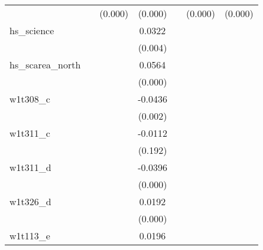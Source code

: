 {\begin{tabular}{l*{6}{c}}
            &                     &     (0.000)         &     (0.000)         &                     &     (0.000)         &     (0.000)         \\
[1em]
hs\_science  &                     &                     &      0.0322\sym{***}&                     &                     &                     \\
            &                     &                     &     (0.004)         &                     &                     &                     \\
[1em]
hs\_scarea\_north&                     &                     &      0.0564\sym{***}&                     &                     &                     \\
            &                     &                     &     (0.000)         &                     &                     &                     \\
[1em]
w1t308\_c    &                     &                     &     -0.0436\sym{***}&                     &                     &                     \\
            &                     &                     &     (0.002)         &                     &                     &                     \\
[1em]
w1t311\_c    &                     &                     &     -0.0112         &                     &                     &                     \\
            &                     &                     &     (0.192)         &                     &                     &                     \\
[1em]
w1t311\_d    &                     &                     &     -0.0396\sym{***}&                     &                     &                     \\
            &                     &                     &     (0.000)         &                     &                     &                     \\
[1em]
w1t326\_d    &                     &                     &      0.0192\sym{***}&                     &                     &                     \\
            &                     &                     &     (0.000)         &                     &                     &                     \\
[1em]
w1t113\_e    &                     &                     &      0.0196\sym{***}&                     &                     &                     \\

\end{tabular}}
